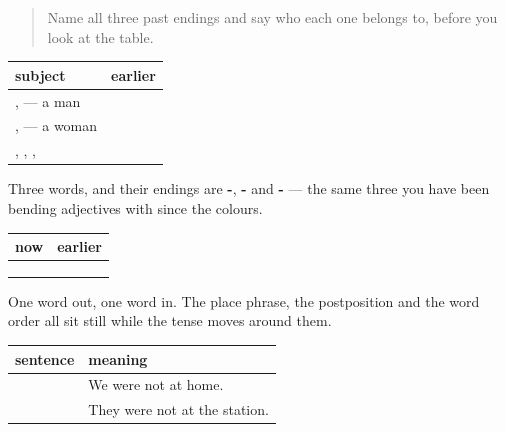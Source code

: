 \begin{quote}
Name all three past endings and say who each one belongs to, before you look at the table.
\end{quote}

\begin{grammarlens}[title={Grammar Lens: the three endings}]
\noindent
\begin{tabularx}{\linewidth}{@{}>{\raggedright\arraybackslash}X>{\raggedright\arraybackslash}X@{}}
\toprule
\textbf{subject} & \textbf{earlier} \\
\midrule
\hi{मैं}, \hi{वह} — a man & \hi{था} \\
\hi{मैं}, \hi{वह} — a woman & \hi{थी} \\
\hi{हम}, \hi{वे}, \hi{आप}, \hi{तुम} & \hi{थे} \\
\bottomrule
\end{tabularx}

Three words, and their endings are \textbf{-}, \textbf{-} and \textbf{-} — the same three you have been bending adjectives with since the colours.
\end{grammarlens}

\begin{grammarlens}[title={Grammar Lens: the swap, in every sentence you own}]
\noindent
\begin{tabularx}{\linewidth}{@{}>{\raggedright\arraybackslash}X>{\raggedright\arraybackslash}X@{}}
\toprule
\textbf{now} & \textbf{earlier} \\
\midrule
\hi{मैं} \hi{घर} \hi{पर} \hi{हूँ।} & \hi{मैं} \hi{घर} \hi{पर} \hi{था।} \\
\hi{वह} \hi{स्टेशन} \hi{पर} \hi{है।} & \hi{वह} \hi{स्टेशन} \hi{पर} \hi{था।} \\
\hi{मैं} \hi{हिंदी} \hi{बोलता} \hi{हूँ।} & \hi{मैं} \hi{हिंदी} \hi{बोलता} \hi{था।} \\
\bottomrule
\end{tabularx}

One word out, one word in. The place phrase, the postposition \textbf{} and the word order all sit still while the tense moves around them.
\end{grammarlens}

\begin{grammarlens}[title={Grammar Lens: with \hi{नहीं}}]
\noindent
\begin{tabularx}{\linewidth}{@{}>{\raggedright\arraybackslash}X>{\raggedright\arraybackslash}X@{}}
\toprule
\textbf{sentence} & \textbf{meaning} \\
\midrule
\hi{हम} \hi{घर} \hi{पर} \hi{नहीं} \hi{थे।} & We were not at home. \\
\hi{वे} \hi{स्टेशन} \hi{पर} \hi{नहीं} \hi{थे।} & They were not at the station. \\
\bottomrule
\end{tabularx}
\end{grammarlens}

